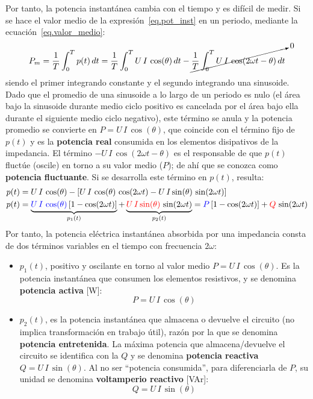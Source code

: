 \documentclass[11pt]{book} %
\begin{document}
	Por tanto, la potencia instantánea cambia con el tiempo y es difícil de medir. Si se hace el valor medio de la expresión~\eqref{eq.pot_inst} en un periodo, mediante la ecuación~\eqref{eq.valor_medio}:
	\begin{equation*}
		P_m=\dfrac{1}{T}\int_{0}^{T}p(t)\,dt=\dfrac{1}{T}\int_{0}^{T}U\,I\,\cos(\theta)\,dt-\cancelto{0}{\dfrac{1}{T}\int_{0}^{T}U\,I\,\cos(2\omega t-\theta)\,dt}
	\end{equation*}
	siendo el primer integrando constante y el segundo integrando una sinusoide. Dado que el promedio de una sinusoide a lo largo de un periodo es nulo (el área bajo la sinusoide durante medio ciclo positivo es cancelada por el área bajo ella durante el siguiente medio ciclo negativo), este término se anula y la potencia promedio se convierte en $P=U\,I\,\cos(\theta)$, que coincide con el término fijo de $p(t)$ y es la \textbf{potencia real} consumida en los elementos disipativos de la impedancia. El término $-U\,I\,\cos(2\omega t-\theta)$ es el responsable de que $p(t)$ fluctúe (oscile) en torno a su valor medio ($P$); de ahí que se conozca como \textbf{potencia fluctuante}. Si se desarrolla este término en $p(t)$, resulta: 
	\begin{align*}
		p(t)&=U\,I\,\cos(\theta)-\left[ U\,I\,\cos(\theta)\,\cos(2\omega t) - U\,I\sin(\theta)\,\sin(2\omega t)\right]\\
		p(t)&=\underbrace{{\color{blue}U\,I\,\cos(\theta)}\left[1-\cos(2\omega t)\right]}_{p_1(t)} + \underbrace{{\color{red}U\,I\sin(\theta)}\,\sin(2\omega t)}_{p_2(t)}={\color{blue}P}\left[1-\cos(2\omega t)\right] + {\color{red}Q}\,\sin(2\omega t)
	\end{align*}
	Por tanto, la potencia eléctrica instantánea absorbida por una impedancia consta de dos términos variables en el tiempo con frecuencia $2\omega$:
	\begin{itemize}
		\item $p_1(t)$, positivo y oscilante en torno al valor medio $P=U\,I\,\cos(\theta)$. Es la potencia instantánea que consumen los elementos resistivos, y se denomina \textbf{potencia activa} [W]:
		\begin{equation}
			\boxed{P=U\,I\,\cos(\theta)}
		\end{equation}
		\item $p_2(t)$, es la potencia instantánea que almacena o devuelve el circuito (no implica transformación en trabajo útil), razón por la que se denomina \textbf{potencia entretenida}. La máxima potencia que almacena/devuelve el circuito se identifica con la $Q$ y se denomina \textbf{potencia reactiva} $Q=U\,I\,\sin(\theta)$. Al no ser ``potencia consumida'', para diferenciarla de $P$, su unidad se denomina \textbf{voltamperio reactivo} [VAr]:
		\begin{equation}
			\boxed{Q=U\,I\,\sin(\theta)}
		\end{equation}
	\end{itemize}
	
\end{document}
